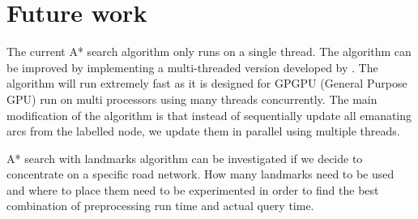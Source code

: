 \section{Future work}
The current A* search algorithm only runs on a single thread.
The algorithm can be improved by implementing a multi-threaded version developed
by \citet{Inam}.
The algorithm will run extremely fast as it is designed for GPGPU (General Purpose GPU) run on multi processors using many threads concurrently.
The main modification of the algorithm is that  
instead of sequentially update all emanating arcs from the labelled node,
we update them in parallel using multiple threads.

A* search with landmarks algorithm can be investigated
if we decide to concentrate on a specific road network.
How many landmarks need to be used and where to place them need to be experimented in order to find the best combination of preprocessing run time and actual query time.
